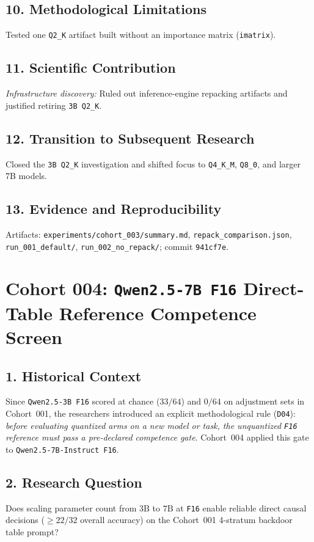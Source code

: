 \subsection*{10. Methodological Limitations}
Tested one \texttt{Q2\_K} artifact built without an importance matrix (\texttt{imatrix}).

\subsection*{11. Scientific Contribution}
\emph{Infrastructure discovery:} Ruled out inference-engine repacking artifacts and justified retiring \texttt{3B Q2\_K}.

\subsection*{12. Transition to Subsequent Research}
Closed the \texttt{3B Q2\_K} investigation and shifted focus to \texttt{Q4\_K\_M}, \texttt{Q8\_0}, and larger 7B models.

\subsection*{13. Evidence and Reproducibility}
Artifacts: \texttt{experiments/cohort\_003/summary.md}, \texttt{repack\_comparison.json}, \texttt{run\_001\_default/}, \texttt{run\_002\_no\_repack/}; commit \texttt{941cf7e}.

\section{Cohort 004: \texttt{Qwen2.5-7B F16} Direct-Table Reference Competence Screen}

\subsection*{1. Historical Context}
Since \texttt{Qwen2.5-3B F16} scored at chance ($33/64$) and $0/64$ on adjustment sets in Cohort~001, the researchers introduced an explicit methodological rule (\texttt{D04}): \emph{before evaluating quantized arms on a new model or task, the unquantized \texttt{F16} reference must pass a pre-declared competence gate}. Cohort~004 applied this gate to \texttt{Qwen2.5-7B-Instruct F16}.

\subsection*{2. Research Question}
Does scaling parameter count from $3\text{B}$ to $7\text{B}$ at \texttt{F16} enable reliable direct causal decisions ($\ge 22/32$ overall accuracy) on the Cohort~001 4-stratum backdoor table prompt?

